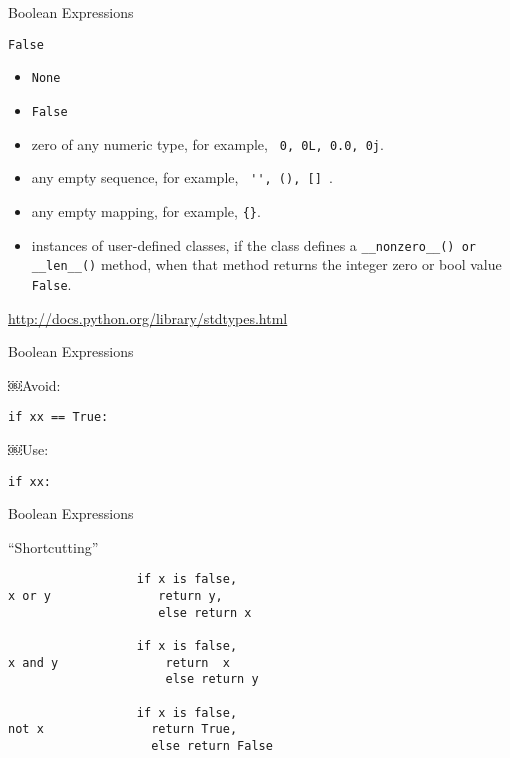 \documentclass{beamer}
\begin{document}
\begin{frame}[fragile]{Boolean Expressions}

{\Large \verb+False+ }

\begin{itemize}
  \item \verb+None+
  \item \verb+False+
  \item zero of any numeric type, for example, \verb+ 0, 0L, 0.0, 0j+.
  \item any empty sequence, for example, \verb+ '', (), [] +.
  \item any empty mapping, for example, \verb+{}+.
  \item instances of user-defined classes, if the class defines a
        \verb+__nonzero__() or __len__()+ method, when that method
        returns the integer zero or bool value \verb+False+.
\end{itemize}

\url{http://docs.python.org/library/stdtypes.html}

\end{frame}

\begin{frame}[fragile]{Boolean Expressions}

{ \Large￼Avoid: }

\vspace{0.1in}
\verb+if xx == True:+

\vfill
{ \Large￼Use: }

\vspace{0.1in}
\verb+if xx:+

\vfill
\end{frame}

\begin{frame}[fragile]{Boolean Expressions}

{\Large ``Shortcutting''}

\begin{verbatim}
                  if x is false, 
x or y               return y,
                     else return x

                  if x is false,
x and y               return  x
                      else return y

                  if x is false,
not x               return True,
                    else return False 
\end{verbatim}

\end{frame} 
\end{document}
